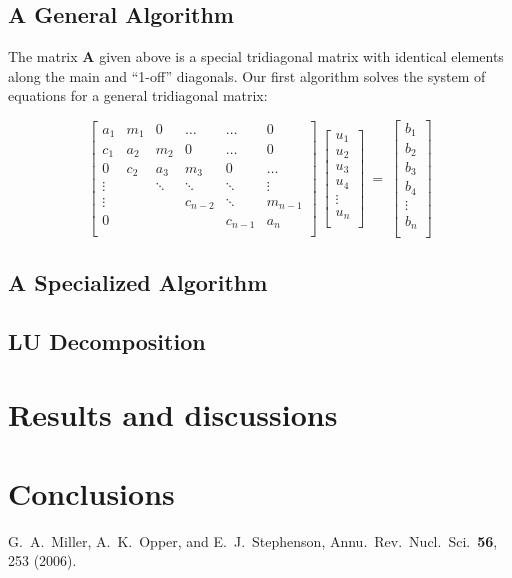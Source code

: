 \documentclass[10pt,showpacs,preprintnumbers,footinbib,amsmath,amssymb,aps,prl,twocolumn,groupedaddress,superscriptaddress,showkeys]{revtex4-1}
\begin{document}
\subsection*{A General Algorithm}

The matrix $\mathbf{A}$ given above is a special tridiagonal matrix with identical elements along
the main and ``1-off'' diagonals. Our first algorithm solves the system of equations for a general
tridiagonal matrix:

\[
\begin{bmatrix}
	a_1 & m_1 & 0 & \dots & \dots & 0 \\
	c_1 & a_2 & m_2 & 0 & \dots & 0 \\
	0 & c_2 & a_3 & m_3 & 0 & \dots \\
	\vdots & & \ddots & \ddots & \ddots & \vdots \\
	\vdots & & & c_{n-2} & \ddots & m_{n-1}\\
	0 & & & & c_{n-1} & a_n \\
\end{bmatrix}
~
\begin{bmatrix}
	u_1\\
	u_2\\
	u_3\\
	u_4\\
	\vdots\\
	u_n\\
\end{bmatrix}
~
=
~
\begin{bmatrix}
	b_1\\
	b_2\\
	b_3\\
	b_4\\
	\vdots\\
	b_n\\
\end{bmatrix}
\]

\subsection*{A Specialized Algorithm}

\subsection*{LU Decomposition}

\section{Results and discussions}



\section{Conclusions}

\begin{thebibliography}{99}
 G.~A.~Miller, A.~K.~Opper, and E.~J.~Stephenson, Annu.~Rev.~Nucl.~Sci.~{\bf 56}, 253 (2006).
\end{thebibliography}
\end{document}
